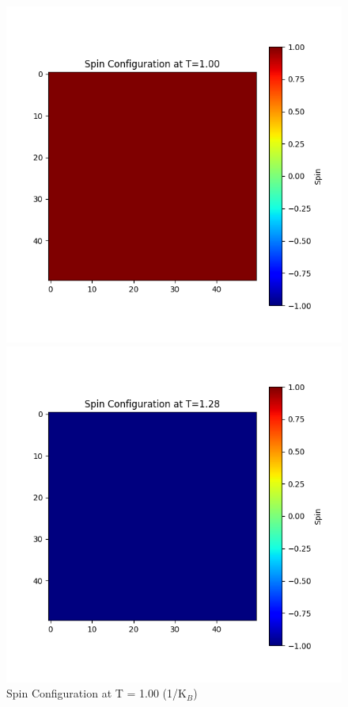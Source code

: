 \documentclass[11pt]{article}
\begin{document}
\begin{figure}[H]
    \centering
    \begin{minipage}{0.32\textwidth}
        \centering
        \includegraphics[width=\textwidth]{Spin_Configuration_at_T=1.00.png}
        \caption{Spin Configuration at T = 1.00 (1/K$_B$)}
        \label{fig:1}
    \end{minipage}\hfill
    \begin{minipage}{0.32\textwidth}
        \centering
        \includegraphics[width=\textwidth]{Spin_Configuration_at_T=1.28.png}

\end{minipage}
\end{figure}
\end{document}
